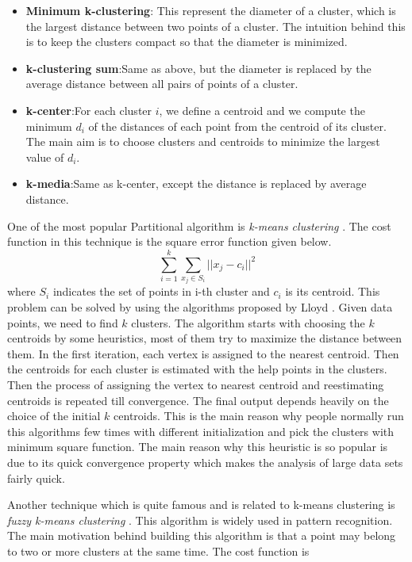 \documentclass[letterpaper]{article}
\begin{document}
\begin{itemize}
\item \textbf{Minimum k-clustering}: This represent the diameter of a cluster,
which is the largest distance between two points of a cluster. The intuition
behind this is to keep the clusters compact so that the diameter is minimized.
\item \textbf{k-clustering sum}:Same as above, but the diameter is replaced by
the average distance between all pairs of points of a cluster.
\item \textbf{k-center}:For each cluster $i$, we define a centroid and we
compute the minimum $d_i$ of the distances of each point from the centroid of
its cluster. The main aim is to choose clusters and centroids to minimize the
largest value of $d_i$. 
\item \textbf{k-media}:Same as k-center, except the distance  is replaced by
average distance.
\end{itemize}

One of the most popular Partitional algorithm is \emph{k-means clustering}
\cite{kmeans67}. The cost function in this technique is the square error
function given below. \\ \begin{equation} \sum_{i=1}^k \sum_{x_j \in S_i} ||x_j
- c_i||^2 \end{equation} where $S_i$ indicates the set of points in i-th
  cluster and $c_i$ is its centroid. This problem can be solved by using the
algorithms proposed by Lloyd \cite{loyd82}. Given data points, we need to find
$k$ clusters. The algorithm starts with choosing the $k$ centroids by some
heuristics, most of them try to maximize the distance between them.
In the first iteration, each vertex is assigned to the nearest centroid. 
Then the centroids for each cluster is estimated with the help points in the
clusters.  Then the process of assigning the vertex to nearest centroid and
reestimating centroids is repeated till convergence. The final output depends
heavily on the choice of the initial $k$ centroids. This is the main reason why
people normally run this algorithms few times with different initialization and
pick the clusters with minimum square function. The main reason why this
heuristic is so popular is due to its quick convergence property which makes
the analysis of large data sets fairly quick.

Another technique which is quite famous and is related to k-means clustering is
\emph{fuzzy k-means clustering} \cite{bez84}. This algorithm is widely used in
pattern  recognition.  The main motivation behind building this algorithm is
that a point may belong to two or more clusters at the same time. The cost
function is 
\end{document}
